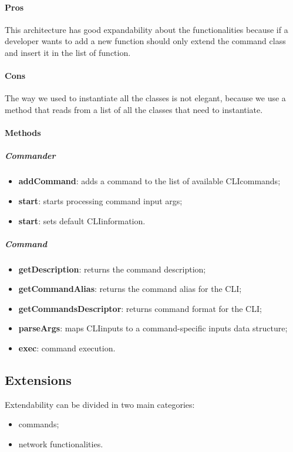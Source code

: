 \paragraph{Pros}
This architecture has good expandability about the functionalities because if a developer wants to add a new function should only extend the command class and insert it in the list of function.
\paragraph{Cons}
The way we used to instantiate all the classes is not elegant, because we use a method that reads from a list of all the classes that need to instantiate.

\paragraph{Methods}
\subparagraph{Commander}
\begin{itemize}
    \item \textbf{addCommand}: adds a command to the list of available CLI\glo commands;
    \item \textbf{start}: starts processing command input args;
    \item \textbf{start}: sets default CLI\glo information.
\end{itemize}
\subparagraph{Command}
\begin{itemize}
    \item \textbf{getDescription}: returns the command description;
    \item \textbf{getCommandAlias}: returns the command alias for the CLI\glo;
    \item \textbf{getCommandsDescriptor}: returns command format for the CLI\glo;
    \item \textbf{parseArgs}: maps CLI\glo inputs to a command-specific inputs data structure;
    \item \textbf{exec}: command execution.
\end{itemize}
\subsection{Extensions}
Extendability can be divided in two main categories:
\begin{itemize}
	\item commands;
	\item network functionalities.
\end{itemize}
